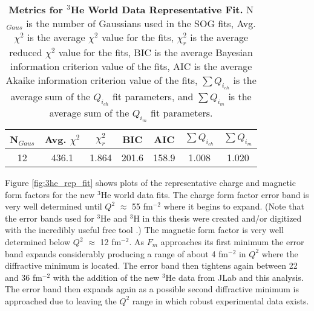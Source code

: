 \begin{table}[!h]
\centering
\begin{tabular}{|c c c c c c c|}
\hline
\textbf{N$_{Gaus}$} & \textbf{Avg. $\chi^2$} & \textbf{$\chi^2_r$} & \textbf{BIC} & \textbf{AIC} & \textbf{$\sum Q_{i_{ch}}$} & \textbf{$\sum Q_{i_{m}}$}\\
\hline
12 & 436.1 & 1.864 & 201.6 & 158.9 & 1.008 & 1.020\\
\hline
\end{tabular}
\caption[Metrics for $^3$He World Data Representative Fit]{{\bf{Metrics for $^3$He World Data Representative Fit.}} N$_{Gaus}$ is the number of Gaussians used in the SOG fits, Avg. $\chi^2$ is the average $\chi^2$ value for the fits, $\chi^2_r$ is the average reduced $\chi^2$ value for the fits, BIC is the average Bayesian information criterion value of the fits, AIC is the average Akaike information criterion value of the fits, $\sum Q_{i_{ch}}$ is the average sum of the $Q_{i_{ch}}$ fit parameters, and $\sum Q_{i_{m}}$ is the average sum of the $Q_{i_{m}}$ fit parameters.}
\label{tab:3he_rep_fit_stats}
\end{table}

Figure \ref{fig:3he_rep_fit} shows plots of the representative charge and magnetic form factors for the new $^3$He world data fits. The charge form factor error band is very well determined until $Q^2$ $\approx$ 55 fm$^{-2}$ where it begins to expand. (Note that the error bands used for $^3$He and $^3$H in this thesis were created and/or digitized with the incredibly useful free tool \cite{web_plot_digitizer}.) The magnetic form factor is very well determined below  $Q^2$ $\approx$ 12 fm$^{-2}$. As $F_m$ approaches its first minimum the error band expands considerably producing a range of about 4 fm$^{-2}$ in $Q^2$ where the diffractive minimum is located. The error band then tightens again between 22 and 36 fm$^{-2}$ with the addition of the new $^3$He data from JLab and this analysis. The error band then expands again as a possible second diffractive minimum is approached due to leaving the $Q^2$ range in which robust experimental data exists. 

